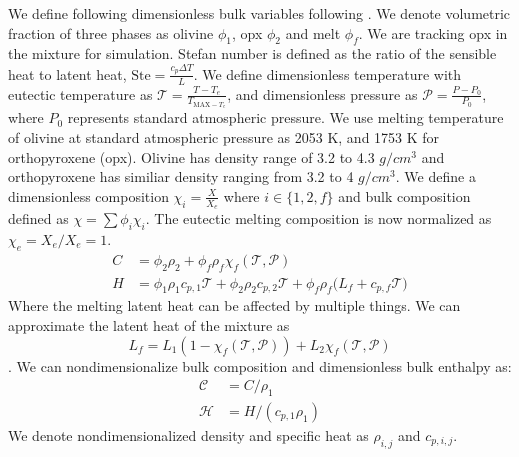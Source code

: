 We define following dimensionless bulk variables following \cite{DownwardOxidantTransport}.
We denote volumetric fraction of three phases as olivine $\phi_1$, opx $\phi_2$ and melt $\phi_f$.
We are tracking opx in the mixture for simulation.
Stefan number is defined as the ratio of the sensible heat to latent heat, $\text{Ste} = \frac{c_p \Delta T}{L}$.
We define dimensionless temperature with eutectic temperature as $\mathcal{T} = \frac{T - T_e}{T_{\text{MAX} - T_e}}$,
and dimensionless pressure as $\mathcal{P} = \frac{P-P_0}{P_0}$, where $P_0$ represents standard atmospheric 
pressure. We use melting temperature of olivine at standard atmospheric pressure as 2053 K, and 
1753 K for orthopyroxene (opx). 
Olivine has density range of 3.2 to 4.3 $g/cm^3$ and orthopyroxene has similiar density ranging from 3.2 to 4 $g/cm^3$.
We define a dimensionless composition $\chi_{i} = \frac{X}{X_e}$ where $i \in \{1,2,f\}$ and bulk composition defined
as $\chi = \sum \phi_i \chi_i$. The eutectic melting composition is now normalized as $\chi_e = X_e/X_e = 1$.
\begin{equation}
		  \begin{aligned}
					 C &= \phi_{2} \rho_{2}   + \phi_{f} \rho_{f} \chi_f(\mathcal{T}, \mathcal{P})\\
					 H &= \phi_{1} \rho_{1} c_{p,1} \mathcal{T} + 
							\phi_{2} \rho_{2} c_{p,2} \mathcal{T} +
							\phi_{f} \rho_{f} \big( L_{f} + c_{p,f}\mathcal{T} \big)
		  \end{aligned}
\end{equation}
Where the melting latent heat can be affected by multiple things.
We can approximate the latent heat of the mixture as $$L_{f} = L_1(1-\chi_f(\mathcal{T},\mathcal{P})) + L_2\chi_f(\mathcal{T},\mathcal{P})$$.
We can nondimensionalize bulk composition and dimensionless bulk enthalpy as:
\begin{equation}
		  \begin{aligned}
					 \mathcal{C} &= C/\rho_1\\
					 \mathcal{H} &= H/(c_{p,1}\rho_1)
		  \end{aligned}
\end{equation}
We denote nondimensionalized density and specific heat as $\rho_{i,j}$ and $c_{p,i,j}$.

